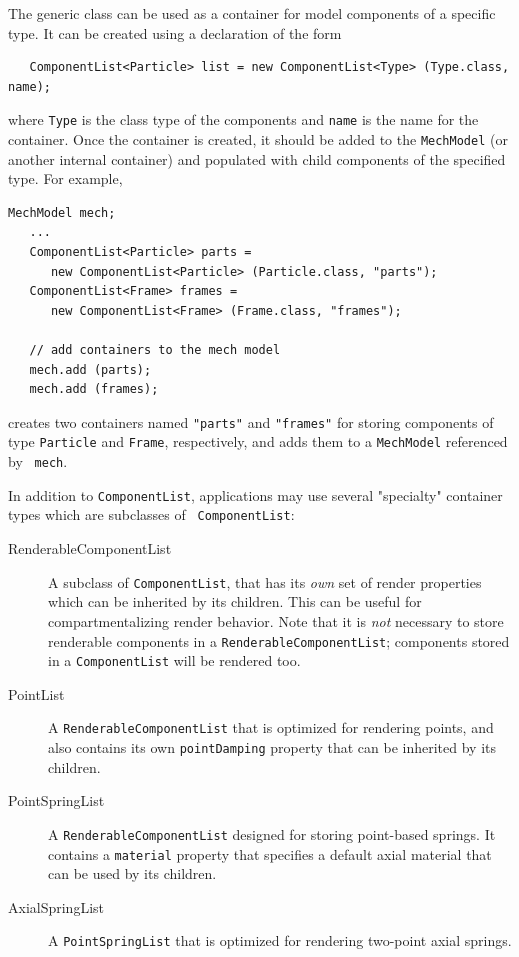 The generic class 
can be used as a container for model components of a specific type.
It can be created using a declaration of the form
%
\begin{lstlisting}
   ComponentList<Particle> list = new ComponentList<Type> (Type.class, name);
\end{lstlisting}
%
where {\tt Type} is the class type of the components and {\tt name} is
the name for the container. Once the container is created, it should
be added to the {\tt MechModel} (or another internal container) and 
populated with child components of the specified type.
For example,
\begin{lstlisting}[]
   MechModel mech; 
   ...
   ComponentList<Particle> parts = 
      new ComponentList<Particle> (Particle.class, "parts");
   ComponentList<Frame> frames = 
      new ComponentList<Frame> (Frame.class, "frames");

   // add containers to the mech model
   mech.add (parts); 
   mech.add (frames);
\end{lstlisting}
creates two containers named {\tt "parts"} and {\tt "frames"} for
storing components of type {\tt Particle} and {\tt Frame},
respectively, and adds them to a {\tt MechModel} referenced by {\tt
mech}.

In addition to {\tt ComponentList}, applications may use several
"specialty" container types which are subclasses of {\tt
ComponentList}:

\begin{description}

\item[RenderableComponentList]\mbox{}

A subclass of {\tt ComponentList}, that
has its {\it own} set of render properties which can be inherited by
its children. This can be useful for compartmentalizing render
behavior.  Note that it is {\it not} necessary to store renderable
components in a {\tt RenderableComponentList}; components stored in a
{\tt ComponentList} will be rendered too.

\item[PointList]\mbox{}

A {\tt RenderableComponentList} that is optimized for
rendering points, and also contains its own {\tt pointDamping}
property that can be inherited by its children.

\item[PointSpringList]\mbox{}

A {\tt RenderableComponentList} designed for
storing point-based springs. It contains a {\tt material} property that
specifies a default axial material that can be used by its children.

\item[AxialSpringList]\mbox{}

A {\tt PointSpringList} that is optimized for
rendering two-point axial springs.

\end{description}

